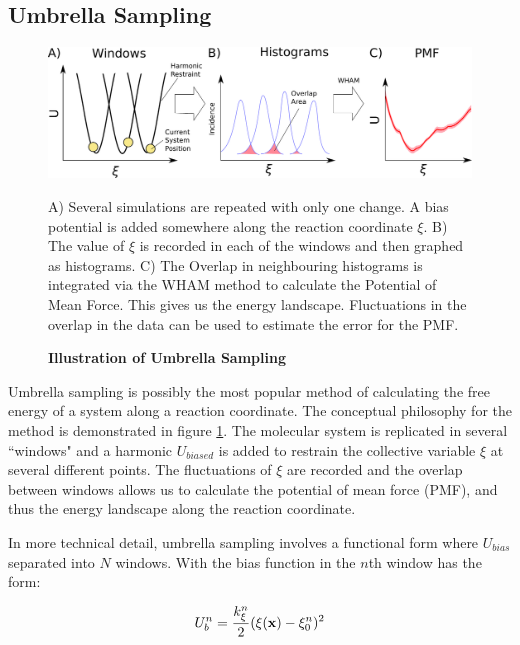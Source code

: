\subsection{Umbrella Sampling}
\begin{figure}
	\begin{center}
		\includegraphics[width=\textwidth]{figures/umbrella_sampling.png.pdf}
	\end{center}
	\captionsetup{singlelinecheck = false, justification=raggedright}
	\caption[Illustration of Umbrella Sampling] {\textbf{Illustration of Umbrella Sampling}}{A) Several simulations are repeated with only one change. A bias  potential is added somewhere along the reaction coordinate $\xi$. B) The value of $\xi$ is recorded in each of the windows and then graphed as histograms. C) The Overlap in neighbouring histograms is integrated via the WHAM method to calculate the Potential of Mean Force. This gives us the energy landscape. Fluctuations in the overlap in the data can be used to estimate the error for the PMF. }
	\label{umbrella_sampling_illustration}
\end{figure}

Umbrella sampling is possibly the most popular method of calculating the free energy of a system along a reaction coordinate. The conceptual philosophy for the method is demonstrated in figure \ref{umbrella_sampling_illustration}. The molecular system is replicated in several ``windows" and a harmonic $U_{biased}$ is added to restrain the collective variable $\xi$ at several different points. The fluctuations of $\xi$ are recorded and the overlap between windows allows us to calculate the potential of mean force (PMF), and thus the energy landscape along the reaction coordinate.  

In more  technical detail, umbrella sampling involves a functional form where $U_{bias}$ separated into $N$ windows. With the bias function in the $n$th window has the form:

\begin{equation}
	U_{b}^n = \frac{k^n_{\xi}}{2}(\xi(\bold{x}) - \xi_0^n)^2
	\label{umbrella_bias}
\end{equation}

